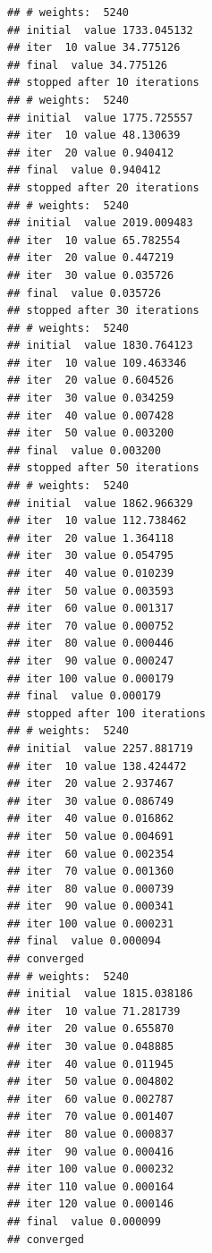 \documentclass[
]{article}
\begin{document}
\begin{verbatim}
## # weights:  5240
## initial  value 1733.045132 
## iter  10 value 34.775126
## final  value 34.775126 
## stopped after 10 iterations
## # weights:  5240
## initial  value 1775.725557 
## iter  10 value 48.130639
## iter  20 value 0.940412
## final  value 0.940412 
## stopped after 20 iterations
## # weights:  5240
## initial  value 2019.009483 
## iter  10 value 65.782554
## iter  20 value 0.447219
## iter  30 value 0.035726
## final  value 0.035726 
## stopped after 30 iterations
## # weights:  5240
## initial  value 1830.764123 
## iter  10 value 109.463346
## iter  20 value 0.604526
## iter  30 value 0.034259
## iter  40 value 0.007428
## iter  50 value 0.003200
## final  value 0.003200 
## stopped after 50 iterations
## # weights:  5240
## initial  value 1862.966329 
## iter  10 value 112.738462
## iter  20 value 1.364118
## iter  30 value 0.054795
## iter  40 value 0.010239
## iter  50 value 0.003593
## iter  60 value 0.001317
## iter  70 value 0.000752
## iter  80 value 0.000446
## iter  90 value 0.000247
## iter 100 value 0.000179
## final  value 0.000179 
## stopped after 100 iterations
## # weights:  5240
## initial  value 2257.881719 
## iter  10 value 138.424472
## iter  20 value 2.937467
## iter  30 value 0.086749
## iter  40 value 0.016862
## iter  50 value 0.004691
## iter  60 value 0.002354
## iter  70 value 0.001360
## iter  80 value 0.000739
## iter  90 value 0.000341
## iter 100 value 0.000231
## final  value 0.000094 
## converged
## # weights:  5240
## initial  value 1815.038186 
## iter  10 value 71.281739
## iter  20 value 0.655870
## iter  30 value 0.048885
## iter  40 value 0.011945
## iter  50 value 0.004802
## iter  60 value 0.002787
## iter  70 value 0.001407
## iter  80 value 0.000837
## iter  90 value 0.000416
## iter 100 value 0.000232
## iter 110 value 0.000164
## iter 120 value 0.000146
## final  value 0.000099 
## converged
\end{verbatim}
\end{document}

